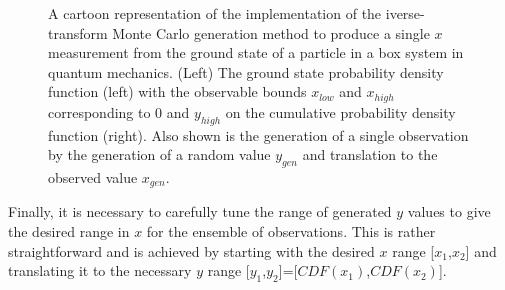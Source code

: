 \documentclass[UKenglish,texlive=2016]{\ATLASLATEXPATH atlasdoc}
\begin{document}
\begin{figure}
 \centering
{}
 \caption{A cartoon representation of the implementation of the iverse-transform Monte Carlo generation method to produce a single $x$ measurement from the ground state of a particle in a box system in quantum mechanics.  (Left) The ground state probability density function (left) with the observable bounds $x_{low}$ and $x_{high}$ corresponding to 0 and $y_{high}$ on the cumulative probability density function (right).  Also shown is the generation of a single observation by the generation of a random value $y_{gen}$ and translation to the observed value $x_{gen}$.}
 \label{fig:particle_in_box_inversetransform}
\end{figure}

\begin{center}
\end{center}

Finally, it is necessary to carefully tune the range of generated $y$ values to give the desired range in $x$ for the ensemble of observations.  This is rather straightforward and is achieved by starting with the desired $x$ range [$x_1$,$x_2$] and translating it to the necessary $y$ range [$y_1$,$y_2$]=[$CDF(x_1)$,$CDF(x_2)$].  
\end{document}
